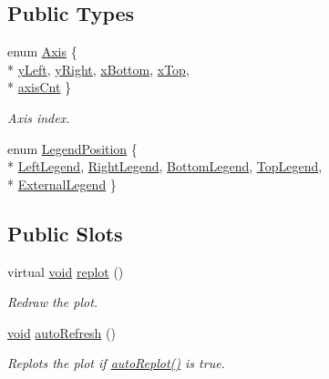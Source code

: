 \subsection*{Public Types}
\begin{DoxyCompactItemize}
\item 
enum \hyperlink{class_qwt_plot_a81df699dcf9dde0752c0726b5f31e271}{Axis} \{ \\*
\hyperlink{class_qwt_plot_a81df699dcf9dde0752c0726b5f31e271a1bb1fbc11e31ebfa8bf72356f6837b17}{y\-Left}, 
\hyperlink{class_qwt_plot_a81df699dcf9dde0752c0726b5f31e271a1de23b30c6b0c08aefe06d6265b65155}{y\-Right}, 
\hyperlink{class_qwt_plot_a81df699dcf9dde0752c0726b5f31e271ad5566960e78f2473c1a1e853def4c4ac}{x\-Bottom}, 
\hyperlink{class_qwt_plot_a81df699dcf9dde0752c0726b5f31e271ae51eb7525eb3f9f806e659614018beb8}{x\-Top}, 
\\*
\hyperlink{class_qwt_plot_a81df699dcf9dde0752c0726b5f31e271aea62036dfd48ee0f9450718592614892}{axis\-Cnt}
 \}
\begin{DoxyCompactList}\small\item\em Axis index. \end{DoxyCompactList}\item 
enum \hyperlink{class_qwt_plot_a31aacb65b5c049dde8c34a0d8482661b}{Legend\-Position} \{ \\*
\hyperlink{class_qwt_plot_a31aacb65b5c049dde8c34a0d8482661ba38b51536a196582bd1f7658c0828eb18}{Left\-Legend}, 
\hyperlink{class_qwt_plot_a31aacb65b5c049dde8c34a0d8482661ba5273f8002504c24f9dae6ce09b08f03c}{Right\-Legend}, 
\hyperlink{class_qwt_plot_a31aacb65b5c049dde8c34a0d8482661ba8b863705308d89b388732f186be15fb5}{Bottom\-Legend}, 
\hyperlink{class_qwt_plot_a31aacb65b5c049dde8c34a0d8482661ba0ee6820a1e8b56737958b738ca23ae34}{Top\-Legend}, 
\\*
\hyperlink{class_qwt_plot_a31aacb65b5c049dde8c34a0d8482661baaac31f6968672ea56773f6db2273af3b}{External\-Legend}
 \}
\end{DoxyCompactItemize}
\subsection*{Public Slots}
\begin{DoxyCompactItemize}
\item 
virtual \hyperlink{group___u_a_v_objects_plugin_ga444cf2ff3f0ecbe028adce838d373f5c}{void} \hyperlink{class_qwt_plot_a7b094e29b8e92b00e36517d0d7633c4b}{replot} ()
\begin{DoxyCompactList}\small\item\em Redraw the plot. \end{DoxyCompactList}\item 
\hyperlink{group___u_a_v_objects_plugin_ga444cf2ff3f0ecbe028adce838d373f5c}{void} \hyperlink{class_qwt_plot_aea78ab565d05b69b8730a4af2a11f07e}{auto\-Refresh} ()
\begin{DoxyCompactList}\small\item\em Replots the plot if \hyperlink{class_qwt_plot_af14053ca41be0f9c6f820ed3c4379831}{auto\-Replot()} is {\ttfamily true}. \end{DoxyCompactList}\end{DoxyCompactItemize}
